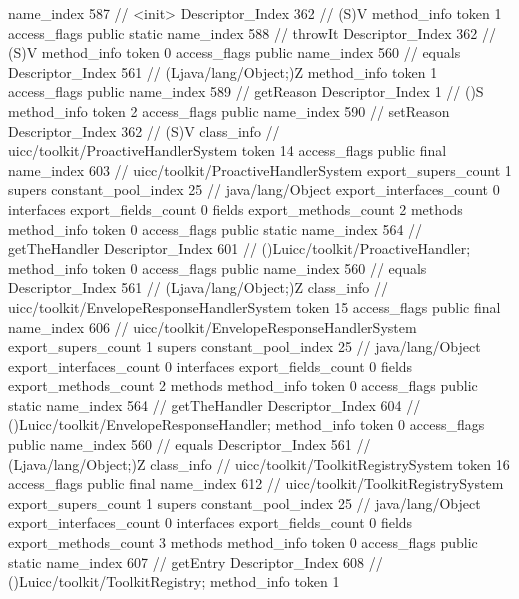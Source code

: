 {{{{{					name_index	587		// <init>
					Descriptor_Index	362		// (S)V
				}
				method_info {
					token	1
					access_flags	public static
					name_index	588		// throwIt
					Descriptor_Index	362		// (S)V
				}
				method_info {
					token	0
					access_flags	public
					name_index	560		// equals
					Descriptor_Index	561		// (Ljava/lang/Object;)Z
				}
				method_info {
					token	1
					access_flags	public
					name_index	589		// getReason
					Descriptor_Index	1		// ()S
				}
				method_info {
					token	2
					access_flags	public
					name_index	590		// setReason
					Descriptor_Index	362		// (S)V
				}
			}
		}
		class_info {		// uicc/toolkit/ProactiveHandlerSystem
			token	14
			access_flags	public final
			name_index	603		// uicc/toolkit/ProactiveHandlerSystem
			export_supers_count	1
			supers {
				constant_pool_index	25		// java/lang/Object
			}
			export_interfaces_count	0
			interfaces {
			}
			export_fields_count	0
			fields {
			}
			export_methods_count	2
			methods {
				method_info {
					token	0
					access_flags	public static
					name_index	564		// getTheHandler
					Descriptor_Index	601		// ()Luicc/toolkit/ProactiveHandler;
				}
				method_info {
					token	0
					access_flags	public
					name_index	560		// equals
					Descriptor_Index	561		// (Ljava/lang/Object;)Z
				}
			}
		}
		class_info {		// uicc/toolkit/EnvelopeResponseHandlerSystem
			token	15
			access_flags	public final
			name_index	606		// uicc/toolkit/EnvelopeResponseHandlerSystem
			export_supers_count	1
			supers {
				constant_pool_index	25		// java/lang/Object
			}
			export_interfaces_count	0
			interfaces {
			}
			export_fields_count	0
			fields {
			}
			export_methods_count	2
			methods {
				method_info {
					token	0
					access_flags	public static
					name_index	564		// getTheHandler
					Descriptor_Index	604		// ()Luicc/toolkit/EnvelopeResponseHandler;
				}
				method_info {
					token	0
					access_flags	public
					name_index	560		// equals
					Descriptor_Index	561		// (Ljava/lang/Object;)Z
				}
			}
		}
		class_info {		// uicc/toolkit/ToolkitRegistrySystem
			token	16
			access_flags	public final
			name_index	612		// uicc/toolkit/ToolkitRegistrySystem
			export_supers_count	1
			supers {
				constant_pool_index	25		// java/lang/Object
			}
			export_interfaces_count	0
			interfaces {
			}
			export_fields_count	0
			fields {
			}
			export_methods_count	3
			methods {
				method_info {
					token	0
					access_flags	public static
					name_index	607		// getEntry
					Descriptor_Index	608		// ()Luicc/toolkit/ToolkitRegistry;
				}
				method_info {
					token	1
}}}}}
